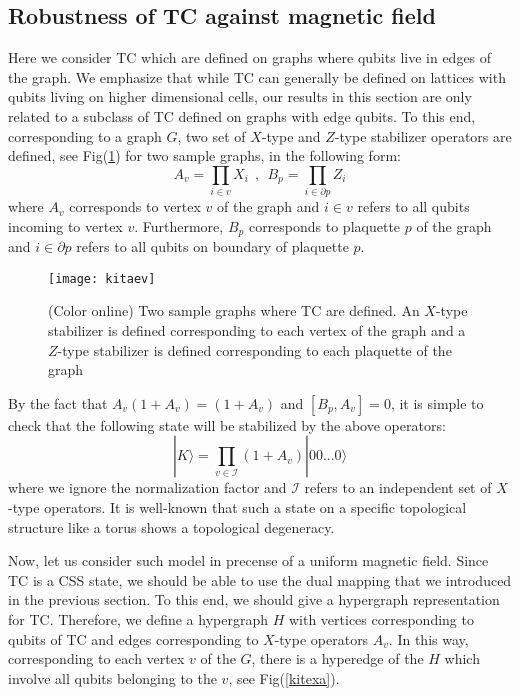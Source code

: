 \documentclass[preprintnumbers, showpacs, floatfix,twocolumn,
preprintnumbers, superscriptaddress]{revtex4}
\def\ra{\rangle}
\begin{document}
\subsection{Robustness of TC against magnetic field}
Here we consider TC which are defined on graphs where qubits live in edges of the graph. We emphasize that while TC can generally be defined on lattices with qubits living on higher dimensional cells, our results in this section are only related to a subclass of TC defined on graphs with edge qubits. To this end, corresponding to a graph $G$, two set of $X$-type and $Z$-type stabilizer operators are defined, see Fig(\ref{kitaev}) for two sample graphs, in the following form:
\begin{equation}
A_v =\prod_{i \in v} X_i ~~,~~B_p =\prod_{i\in \partial p}Z_i
\end{equation}
where $A_v$ corresponds to vertex $v$ of the graph and $i\in v$ refers to all qubits incoming to vertex $v$. Furthermore, $B_p$ corresponds to plaquette $p$ of the graph and $i\in \partial p$ refers to all qubits on boundary of plaquette $p$.
\begin{figure}[t]
\centering
\texttt{[image: kitaev]}
\caption{(Color online) Two sample graphs where TC are defined. An $X$-type stabilizer is defined corresponding to each vertex of the graph and a $Z$-type stabilizer is defined corresponding to each plaquette of the graph} \label{kitaev}
\end{figure}
By the fact that $A_v (1+A_v)=(1+A_v)$ and $[B_p , A_v ]=0$, it is simple to check that the following state will be stabilized by the above operators:
\begin{equation}
|K\ra =\prod_{v\in \mathcal{I}}(1+A_v)|00...0\ra
\end{equation}
where we ignore the normalization factor and $\mathcal{I}$ refers to an independent set of $X$-type operators. It is well-known that such a state on a specific topological structure like a torus shows a topological degeneracy.

Now, let us consider such model in precense of a uniform magnetic field. Since TC is a CSS state, we should be able to use the dual mapping that we introduced in the previous section. To this end, we should give a hypergraph representation for TC. Therefore, we define a hypergraph $H$ with vertices corresponding to qubits of TC and edges corresponding to $X$-type operators $A_v$. In this way, corresponding to each vertex $v$ of the $G$, there is a hyperedge of the $H$ which involve all qubits belonging to the $v$, see Fig(\ref{kitexa}).
\end{document}
